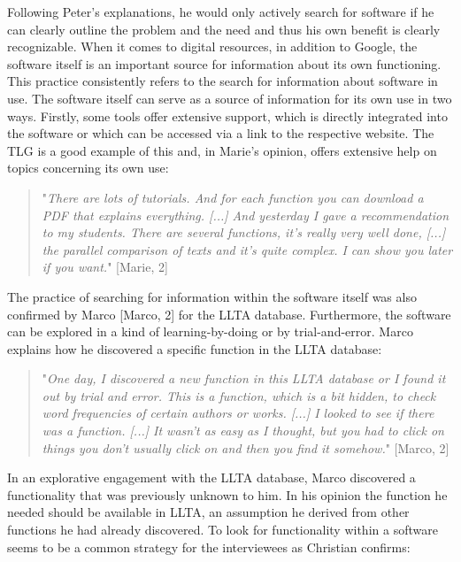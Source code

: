 \documentclass[12pt, a4paper, titlepage, oneside, abstract=true, toc=listof, toc=bibliography]{scrreprt}
\begin{document}
{Following Peter's explanations, he would only actively search for software if he can clearly outline the problem and the need and thus his own benefit is clearly recognizable.
When it comes to digital resources, in addition to Google, the software itself is an important source for information about its own functioning. This practice consistently refers to the search for information about software in use.
The software itself can serve as a source of information for its own use in two ways. Firstly, some tools offer extensive support, which is directly integrated into the software or which can be accessed via a link to the respective website. The TLG is a good example of this and, in Marie's opinion, offers extensive help on topics concerning its own use:

\begin{quotation}
"\textit{There are lots of tutorials. And for each function you can download a PDF that explains everything. [...] And yesterday I gave a recommendation to my students. There are several functions, it's really very well done, [...] the parallel comparison of texts and it's quite complex. I can show you later if you want.}" [Marie, 2]
\end{quotation}

The practice of searching for information within the software itself was also confirmed by Marco [Marco, 2] for the \gls{LLTA} database.
Furthermore, the software can be explored in a kind of learning-by-doing or by trial-and-error. Marco explains how he discovered a specific function in the LLTA database:

\begin{quotation}
"\textit{One day, I discovered a new function in this LLTA database or I found it out by trial and error. This is a function, which is a bit hidden, to check word frequencies of certain authors or works. [...] I looked to see if there was a function. [...] It wasn't as easy as I thought, but you had to click on things you don't usually click on and then you find it somehow.}" [Marco, 2]
\end{quotation}

In an explorative engagement with the LLTA database, Marco discovered a functionality that was previously unknown to him. In his opinion the function he needed should be available in LLTA, an assumption he derived from other functions he had already discovered. To look for functionality within a software seems to be a common strategy for the interviewees as Christian confirms:

}
\end{document}
